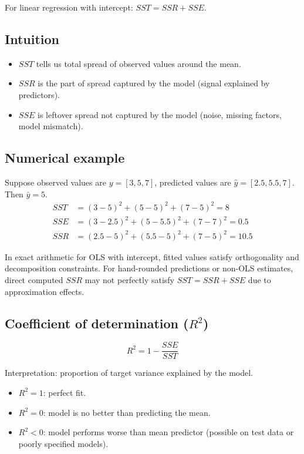 \documentclass[12pt,a4paper]{article}
\begin{document}
For linear regression with intercept: $SST = SSR + SSE$.

\subsection*{Intuition}
\begin{itemize}[noitemsep]
    \item $SST$ tells us total spread of observed values around the mean.
    \item $SSR$ is the part of spread captured by the model (signal explained by predictors).
    \item $SSE$ is leftover spread not captured by the model (noise, missing factors, model mismatch).
\end{itemize}

\subsection*{Numerical example}
Suppose observed values are $y=[3,5,7]$, predicted values are $\hat{y}=[2.5,5.5,7]$.
Then $\bar{y}=5$.
\begin{align}
SST &= (3-5)^2 + (5-5)^2 + (7-5)^2 = 8 \\
SSE &= (3-2.5)^2 + (5-5.5)^2 + (7-7)^2 = 0.5 \\
SSR &= (2.5-5)^2 + (5.5-5)^2 + (7-5)^2 = 10.5
\end{align}

In exact arithmetic for OLS with intercept, fitted values satisfy orthogonality and decomposition constraints.
For hand-rounded predictions or non-OLS estimates, direct computed $SSR$ may not perfectly satisfy $SST=SSR+SSE$ due to approximation effects.

\subsection*{Coefficient of determination ($R^2$)}
\begin{equation}
R^2 = 1 - \frac{SSE}{SST}
\end{equation}

Interpretation: proportion of target variance explained by the model.
\begin{itemize}[noitemsep]
    \item $R^2=1$: perfect fit.
    \item $R^2=0$: model is no better than predicting the mean.
    \item $R^2<0$: model performs worse than mean predictor (possible on test data or poorly specified models).
\end{itemize}
\end{document}
